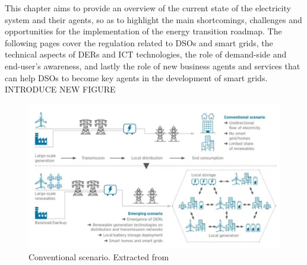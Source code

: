 This chapter aims to provide an overview of the current state of the electricity system and their agents, so as to highlight the main shortcomings, challenges and opportunities for the implementation of the energy transition roadmap. The following pages cover the regulation related to DSOs and smart grids, the technical aspects of DERs and ICT technologies, the role of demand-side and end-user's awareness, and lastly the role of new business agents and services that can help DSOs to become key agents in the development of smart grids. 
INTRODUCE NEW FIGURE 
\begin{figure}[]
	\centering 
	\includegraphics[width=1\columnwidth ]{ChapterIntro/Figures/Irena-DSO-1.png}
		\caption{Conventional scenario. Extracted from \cite{IRENA2018}}  
		\label{fig:scenarios}
\end{figure}



%

